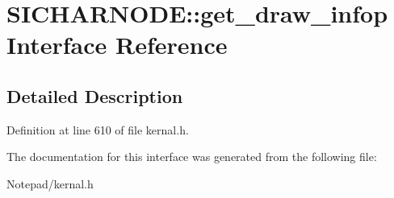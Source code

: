 \section{S\+I\+C\+H\+A\+R\+N\+O\+DE\+:\+:get\+\_\+draw\+\_\+infop Interface Reference}
\label{interface_s_i_c_h_a_r_n_o_d_e_1_1get__draw__infop}


\subsection{Detailed Description}


Definition at line 610 of file kernal.\+h.



The documentation for this interface was generated from the following file\+:\begin{DoxyCompactItemize}
\item 
Notepad/kernal.\+h\end{DoxyCompactItemize}
